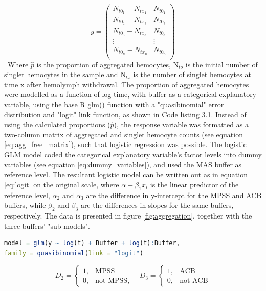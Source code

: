 \begin{equation}
    \label{eq:agg_free_matrix}
    y = 
    \begin{pmatrix}
      N_{t0_{1}} - N_{tx_{1}} &  N_{t0_{1}} \\
      N_{t0_{2}} - N_{tx_{2}} &  N_{t0_{2}} \\
      N_{t0_{3}} - N_{tx_{3}} &  N_{t0_{3}} \\
      \vdots                   & \vdots       \\
      N_{t0_{n}} - N_{tx_{n}} &  N_{t0_{n}} \\
    \end{pmatrix}
\end{equation}
\
Where $\hat{p}$ is the proportion of aggregated hemocytes, N$_{to}$ is the initial number of singlet hemocytes in the sample and N$_{tx}$ is the number of singlet hemocytes at time x after hemolymph withdrawal. The proportion of aggregated hemocytes were modelled as a function of log time, with buffer as a categorical explanatory variable, using the base R glm() function with a "quasibinomial" error distribution and "logit" link function, as shown in Code listing 3.1. Instead of using the calculated proportions ($\hat{p}$), the response variable was formatted as a two-column matrix of aggregated and singlet hemocyte counts (see equation \ref{eq:agg_free_matrix}), such that logistic regression was possible. The logistic GLM model coded the categorical explanatory variable's factor levels into dummy variables (see equation \ref{eq:dummy_variables}), and used the MAS buffer as reference level. The resultant logistic model can be written out as in equation \ref{eq:logit} on the original scale, where $\alpha + \beta_{1}x_{i}$ is the linear predictor of the reference level, $\alpha_{2}$ and $\alpha_{3}$ are the difference in y-intercept for the MPSS and ACB buffers, while $\beta_{2}$ and $\beta_{3}$ are the differences in slopes for the same buffers, respectively. The data is presented in figure \ref{fig:aggregation}, together with the three buffers' "sub-models".

\begin{lstlisting}[language=R, caption = {The R source code run to fit the logistic proportion aggregation model.}]
model = glm(y ~ log(t) + Buffer + log(t):Buffer,
family = quasibinomial(link = "logit")
\end{lstlisting}

\begin{equation}
    \label{eq:dummy_variables}
D_{2} =\begin{cases}
      1, & \text{MPSS}\\
      0, & \text{not MPSS},
    \end{cases}
    \quad
D_{3} =\begin{cases}
      1, & \text{ACB}\\
      0, & \text{not ACB}
    \end{cases}
\end{equation}

